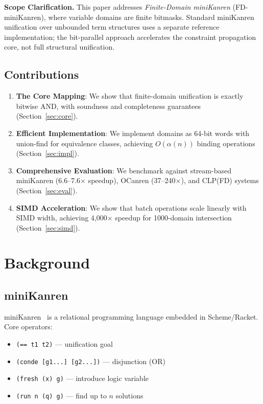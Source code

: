 \documentclass[11pt,a4paper]{article}
\newcommand{\fdmk}{FD-miniKanren\xspace}
\begin{document}
\textbf{Scope Clarification.}
This paper addresses \emph{Finite-Domain miniKanren} (\fdmk),
where variable domains are finite bitmasks.
Standard miniKanren unification over unbounded term structures uses a separate
reference implementation; the bit-parallel approach accelerates the constraint
propagation core, not full structural unification.

\subsection{Contributions}

\begin{enumerate}
  \item \textbf{The Core Mapping}: We show that finite-domain unification is exactly bitwise AND, with soundness and completeness guarantees (Section~\ref{sec:core}).

  \item \textbf{Efficient Implementation}: We implement domains as 64-bit words with union-find for equivalence classes, achieving $O(\alpha(n))$ binding operations (Section~\ref{sec:impl}).

  \item \textbf{Comprehensive Evaluation}: We benchmark against stream-based miniKanren (6.6--7.6$\times$ speedup), OCanren (37--240$\times$), and CLP(FD) systems (Section~\ref{sec:eval}).

  \item \textbf{SIMD Acceleration}: We show that batch operations scale linearly with SIMD width, achieving 4,000$\times$ speedup for 1000-domain intersection (Section~\ref{sec:simd}).
\end{enumerate}

\section{Background}

\subsection{miniKanren}

miniKanren~\cite{reasoned_schemer_chirho} is a relational programming language embedded in Scheme/Racket.
Core operators:
\begin{itemize}
  \item \texttt{(== t1 t2)} --- unification goal
  \item \texttt{(conde [g1...] [g2...])} --- disjunction (OR)
  \item \texttt{(fresh (x) g)} --- introduce logic variable
  \item \texttt{(run n (q) g)} --- find up to $n$ solutions
\end{itemize}
\end{document}
